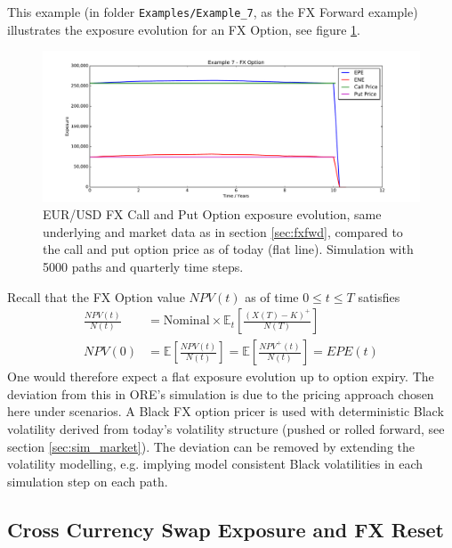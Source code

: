 \documentclass[12pt, a4paper]{article}
\newcommand\E{\ensuremath{\mathbb{E}}}
\newcommand{\EPE}{\mathit{EPE}}
\begin{document}
This example (in folder {\tt Examples/Example\_7}, as the FX Forward example) illustrates the exposure evolution for an
FX Option, see figure \ref{fig_7}.
\begin{figure}[h!]
\begin{center}
\includegraphics[scale=0.45]{mpl_fxoption.pdf}
\end{center}
\caption{EUR/USD FX Call and Put Option exposure evolution, same underlying and market data as in section
  \ref{sec:fxfwd}, compared to the call and put option price as of today (flat line). Simulation with 5000 paths and
  quarterly time steps.}
\label{fig_7}
\end{figure}
Recall that the FX Option value $NPV(t)$ as of time $0 \leq t \leq T$ satisfies
\begin{align*}
\frac{NPV(t)}{N(t)} &= \mbox{Nominal}\times\E_t\left[\frac{(X(T) - K)^+}{N(T)}\right]\\
NPV(0) &= \E\left[\frac{NPV(t)}{N(t)}\right] = \E\left[\frac{NPV^+(t)}{N(t)} \right]= \EPE(t) 
\end{align*}
One would therefore expect a flat exposure evolution up to option expiry. The deviation from this in ORE's simulation is
due to the pricing approach chosen here under scenarios. A Black FX option pricer is used with deterministic Black
volatility derived from today's volatility structure (pushed or rolled forward, see section \ref{sec:sim_market}). The
deviation can be removed by extending the volatility modelling, e.g. implying model consistent Black volatilities in
each simulation step on each path.  

\subsection{Cross Currency Swap Exposure and FX Reset}
\end{document}
